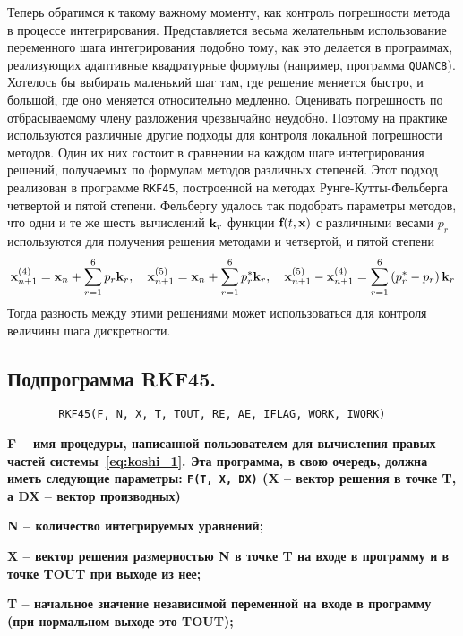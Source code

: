 Теперь обратимся к такому важному моменту, как контроль погрешности метода в процессе интегрирования. Представляется
весьма желательным использование переменного шага интегрирования подобно тому, как это делается в программах,
реализующих адаптивные квадратурные формулы (например, программа \verb|QUANC8|). Хотелось бы выбирать маленький шаг
там, где решение меняется быстро, и большой, где оно меняется относительно медленно. Оценивать погрешность по
отбрасываемому члену разложения чрезвычайно неудобно. Поэтому на практике используются различные другие подходы для
контроля локальной погрешности методов. Один их них состоит в сравнении на каждом шаге интегрирования решений,
получаемых по формулам методов различных степеней. Этот подход реализован в программе \verb|RKF45|, построенной на
методах Рунге-Кутты-Фельберга четвертой и пятой степени. Фельбергу удалось так подобрать параметры методов, что
одни и те же шесть вычислений $\bf{k}_r$ функции $\bf{f}(t, \bf{x})$ с различными весами $p_r$ используются для
получения решения методами и четвертой, и пятой степени
\begin{equation*}
    \bf{x}_{n+1}^{(4)} = \bf{x}_n + \sum_{r=1}^{6} p_r \bf{k}_r, \quad \bf{x}_{n+1}^{(5)} = \bf{x}_n + \sum_{r=1}^{6} p_r^* \bf{k}_r,
    \quad \bf{x}_{n+1}^{(5)} - \bf{x}_{n+1}^{(4)} = \sum_{r=1}^{6} \left( p_r^* - p_r \right)\bf{k}_r
\end{equation*}
Тогда разность между этими решениями может использоваться для контроля величины шага дискретности.

\subsection{Подпрограмма \textbf{RKF45}.}
\begin{verbatim}
        RKF45(F, N, X, T, TOUT, RE, AE, IFLAG, WORK, IWORK)
\end{verbatim}
\bf{F} -- имя процедуры, написанной пользователем для вычисления правых частей системы~\eqref{eq:koshi_1}. Эта
программа, в свою очередь, должна иметь следующие параметры: \verb|F(T, X, DX)| (\bf{X} -- вектор решения в точке \bf{T}, а \bf{DX} -- вектор производных)

\bf{N} -- количество интегрируемых уравнений;

\bf{X} -- вектор решения размерностью \bf{N} в точке \bf{T} на входе в программу и в точке \bf{TOUT} при выходе из нее;

\bf{T} -- начальное значение независимой переменной на входе в программу (при нормальном выходе это \bf{TOUT});

